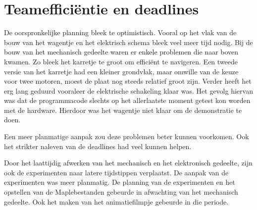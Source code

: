 \section{Teamefficiëntie en deadlines}
\label{section:teamefficientie}

De oorspronkelijke planning bleek te optimistisch. Vooral op het vlak van de bouw van het wagentje en het elektrisch schema bleek veel meer tijd nodig.
Bij de bouw van het mechanisch gedeelte waren er enkele problemen die naar boven kwamen. Zo bleek het karretje te groot om efficiënt te navigeren.
Een tweede versie van het karretje had een kleiner grondvlak, maar omwille van de keuze voor twee motoren, moest de plaat nog steeds relatief groot zijn.
Verder heeft het erg lang geduurd vooraleer de elektrische schakeling klaar was. Het gevolg hiervan was dat de programmacode slechts op het allerlaatste moment getest kon worden  met de hardware. Hierdoor was het wagentje niet klaar om de demonstratie te doen.

Een meer planmatige aanpak zou deze problemen beter kunnen voorkomen. Ook het strikter naleven van de deadlines had veel kunnen helpen.

Door het laattijdig afwerken van het mechanisch en het elektronisch gedeelte, zijn ook de experimenten naar latere tijdstippen verplaatst. De aanpak van de experimenten was meer planmatig.
De planning van de experimenten en het opstellen van de Maplebestanden gebeurde in afwachting van het mechanisch gedeelte. Ook het maken van het animatiefilmpje gebeurde in die periode.